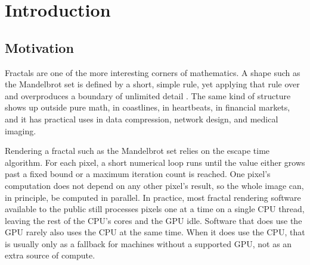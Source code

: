 \documentclass{ftndiplomski}
\begin{document}
\maketitle


\clearpage
\thispagestyle{empty}
\tableofcontents

\clearpage
\setcounter{page}{1}

\chapter{Introduction}
\label{ch:intro}

\section{Motivation}
\label{sec:motivation}

Fractals are one of the more interesting corners of mathematics. A shape such as the Mandelbrot
set is defined by a short, simple rule, yet applying that rule over and overproduces a boundary
of unlimited detail \cite{mandelbrot1982}. The same kind of structure shows up outside pure math,
in coastlines, in heartbeats, in financial markets, and it has practical uses in data compression,
network design, and medical imaging.

Rendering a fractal such as the Mandelbrot set relies on the escape time algorithm. For each pixel,
a short numerical loop runs until the value either grows past a fixed bound or a maximum iteration
count is reached. One pixel's computation does not depend on any other pixel's result, so the whole
image can, in principle, be computed in parallel. In practice, most fractal rendering software
available to the public still processes pixels one at a time on a single CPU thread, leaving the
rest of the CPU's cores and the GPU idle. Software that does use the GPU rarely also uses the CPU
at the same time. When it does use the CPU, that is usually only as a fallback for machines without
a supported GPU, not as an extra source of compute.
\end{document}
